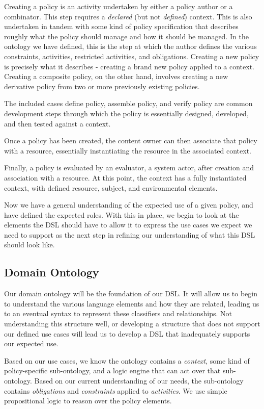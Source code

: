Creating a policy is an activity undertaken by either a policy author or a combinator.  This step requires a \textit{declared} (but not \textit{defined}) context.  This is also undertaken in tandem with some kind of policy specification that describes roughly what the policy should manage and how it should be managed.  In the ontology we have defined, this is the step at which the author defines the various constraints, activities, restricted activities, and obligations.  Creating a new policy is precisely what it describes - creating a brand new policy applied to a context.  Creating a composite policy, on the other hand, involves creating a new derivative policy from two or more previously existing policies.

The included cases define policy, assemble policy, and verify policy are common development steps through which the policy is essentially designed, developed, and then tested against a context.

Once a policy has been created, the content owner can then associate that policy with a resource, essentially instantiating the resource in the associated context.

Finally, a policy is evaluated by an evaluator, a system actor, after creation and association with a resource.  At this point, the context has a fully instantiated context, with defined resource, subject, and environmental elements.

Now we have a general understanding of the expected use of a given policy, and have defined the expected roles.  With this in place, we begin to look at the elements the DSL should have to allow it to express the use cases we expect we need to support as the next step in refining our understanding of what this DSL should look like.

\subsection{Domain Ontology}
Our domain ontology will be the foundation of our DSL.  It will allow us to begin to understand the various language elements and how they are related, leading us to an eventual syntax to represent these classifiers and relationships.  Not understanding this structure well, or developing a structure that does not support our defined use cases will lead us to develop a DSL that inadequately supports our expected use.

Based on our use cases, we know the ontology contains a \textit{context}, some kind of policy-specific sub-ontology, and a logic engine that can act over that sub-ontology.  Based on our current understanding of our needs, the sub-ontology contains \textit{obligations} and \textit{constraints} applied to \textit{activities}.  We use simple propositional logic to reason over the policy elements.

